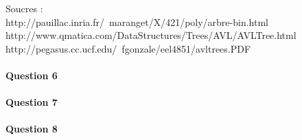 \documentclass[a4paper]{article}
\begin{document}
{\footnotesize Soucres : \\
http://pauillac.inria.fr/~maranget/X/421/poly/arbre-bin.html\\
http://www.qmatica.com/DataStructures/Trees/AVL/AVLTree.html\\
http://pegasus.cc.ucf.edu/~fgonzale/eel4851/avltrees.PDF\\}

\paragraph*{Question 6}
\paragraph*{Question 7}
\paragraph*{Question 8}
\end{document}
